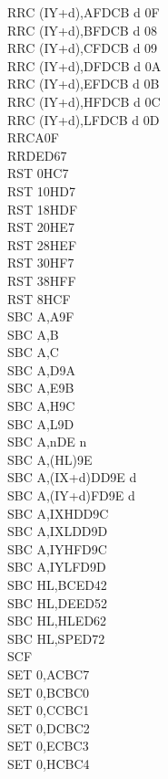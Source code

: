 \begin{multicols}{3}
{\begin{tabbing}
		RRC (IY+d),A\UNDOC\>FDCB d 0F\\
		RRC (IY+d),B\UNDOC\>FDCB d 08\\
		RRC (IY+d),C\UNDOC\>FDCB d 09\\
		RRC (IY+d),D\UNDOC\>FDCB d 0A\\
		RRC (IY+d),E\UNDOC\>FDCB d 0B\\
		RRC (IY+d),H\UNDOC\>FDCB d 0C\\
		RRC (IY+d),L\UNDOC\>FDCB d 0D\\
		RRCA\>0F\\
		RRD\>ED67\\
		RST 0H\>C7\\
		RST 10H\>D7\\
		RST 18H\>DF\\
		RST 20H\>E7\\
		RST 28H\>EF\\
		RST 30H\>F7\\
		RST 38H\>FF\\
		RST 8H\>CF\\
		SBC A,A\>9F\\
		SBC A,B\\
		SBC A,C\\
		SBC A,D\>9A\\
		SBC A,E\>9B\\
		SBC A,H\>9C\\
		SBC A,L\>9D\\
		SBC A,n\>DE n\\
		SBC A,(HL)\>9E\\
		SBC A,(IX+d)\>DD9E d\\
		SBC A,(IY+d)\>FD9E d\\
		SBC A,IXH\UNDOC\>DD9C\\
		SBC A,IXL\UNDOC\>DD9D\\
		SBC A,IYH\UNDOC\>FD9C\\
		SBC A,IYL\UNDOC\>FD9D\\
		SBC HL,BC\>ED42\\
		SBC HL,DE\>ED52\\
		SBC HL,HL\>ED62\\
		SBC HL,SP\>ED72\\
		SCF\\
		SET 0,A\>CBC7\\
		SET 0,B\>CBC0\\
		SET 0,C\>CBC1\\
		SET 0,D\>CBC2\\
		SET 0,E\>CBC3\\
		SET 0,H\>CBC4\\

\end{tabbing}}
\end{multicols}
